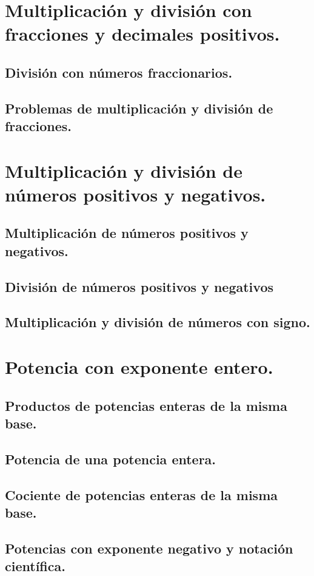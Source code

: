 \documentclass[11pt]{book}
\begin{document}
\section{Multiplicación y división con fracciones y decimales positivos.}
\subsection{División con números fraccionarios.}
\subsection{Problemas de multiplicación y división de fracciones.}

\section{Multiplicación y división de números positivos y negativos.}
\subsection{Multiplicación de números positivos y negativos.}
\subsection{División de números positivos y negativos}
\subsection{Multiplicación y división de números con signo.}

\section{Potencia con exponente entero.}
\subsection{Productos de potencias enteras de la misma base.}
\subsection{Potencia de una potencia entera.}
\subsection{Cociente de potencias enteras de la misma base.}
\subsection{Potencias con exponente negativo y notación científica.}
\end{document}
